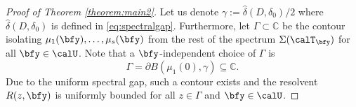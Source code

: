 
\begin{proof}[Proof of Theorem \ref{theorem:main2}] 


Let us denote $\gamma := \hat \delta(D, \delta_0)/2 $ where $\hat{\delta}(D,\delta_0)$ is defined in \eqref{eq:spectralgap}. Furthermore, let $\Gamma \subset \mathbb{C}$ be the contour isolating $\mu_1(\bfy), \ldots, \mu_s(\bfy)$ from the rest of the spectrum $\Sigma(\calT_{\bfy})$ for all $ \bfy \in \calU$.
Note that a $\bfy$-independent choice of $\Gamma$  is 
\begin{equation}
    \Gamma = \partial B( \mu_1(0), \gamma) \subseteq \mathbb{C}.
\end{equation} Due to the uniform spectral gap, such a contour exists and the resolvent $R(z,\bfy)$ is uniformly bounded for all $z \in \Gamma$ and $\bfy \in \calU$.


\end{proof}
